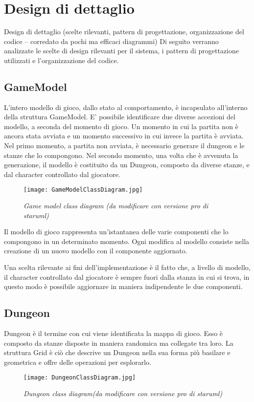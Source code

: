 \section{Design di dettaglio}
Design di dettaglio (scelte rilevanti, pattern di progettazione, organizzazione del codice -- corredato da pochi ma efficaci diagrammi)
Di seguito verranno analizzate le scelte di design rilevanti per il sistema, i pattern di progettazione utilizzati e l'organizzazione del codice. 
\subsection{GameModel}
L'intero modello di gioco, dallo stato al comportamento, è incapsulato all'interno della struttura GameModel. E' possibile identificare due diverse accezioni del modello, a seconda del momento di gioco. 
Un momento in cui la partita non è ancora stata avviata e un momento successivo in cui invece la partita è avviata.
Nel primo momento, a partita non avviata, è necessario generare il dungeon e le stanze che lo compongono. Nel secondo momento, una volta che è avvenuta la generazione, il modello è costituito da un Dungeon, composto da diverse stanze, e dal character controllato dal giocatore. 

\begin{figure}[!hbt]
    \centering
    \texttt{[image: GameModelClassDiagram.jpg]}
    \caption{\textit{Game model class diagram (da modificare con versione pro di staruml)}} 
\end{figure}
Il modello di gioco rappresenta un'istantanea delle varie componenti che lo compongono in un determinato momento. 
Ogni modifica al modello consiste nella creazione di un nuovo modello con il componente aggiornato. 

Una scelta rilevante ai fini dell'implementazione è il fatto che, a livello di modello, il character controllato dal giocatore è sempre fuori dalla stanza in cui si trova, in questo modo è possibile aggiornare in maniera indipendente le due componenti.
\subsection{Dungeon}
Dungeon è il termine con cui viene identificata la mappa di gioco. Esso è composto da stanze disposte in maniera randomica ma collegate tra loro. 
La struttura Grid è ciò che descrive un Dungeon nella sua forma più basilare e geometrica e offre delle operazioni per esplorarlo. 
\begin{figure}[!hbt]
    \centering
    \texttt{[image: DungeonClassDiagram.jpg]}
    \caption{\textit{Dungeon class diagram(da modificare con versione pro di staruml)}} 
\end{figure}

